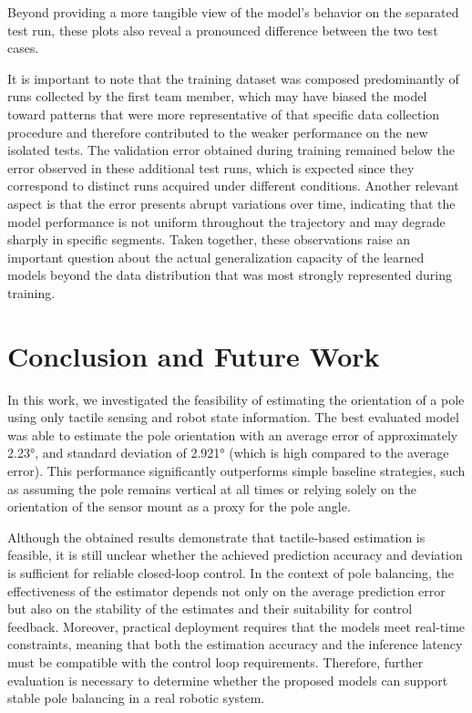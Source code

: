 \documentclass{article}
\begin{document}
Beyond providing a more tangible view of the model's behavior on the separated test run, these plots also reveal a pronounced difference between the two test cases.

It is important to note that the training dataset was composed
predominantly of runs collected by the first team member,
which may have biased the model toward patterns that were more
representative of that specific data collection procedure and
therefore contributed to the weaker performance on the new
isolated tests. The validation error obtained during training
remained below the error observed in these additional test
runs, which is expected since they correspond to distinct runs
acquired under different conditions. Another relevant aspect
is that the error presents abrupt variations over time,
indicating that the model performance is not uniform throughout
the trajectory and may degrade sharply in specific segments.
Taken together, these observations raise an important
question about the actual generalization capacity of the
learned models beyond the data distribution that was most
strongly represented during training.

\section{Conclusion and Future Work}

In this work, we investigated the feasibility of estimating the
orientation of a pole using only tactile sensing and robot state
information. The best evaluated model was able to estimate the pole
orientation with an average error of approximately 2.23°, and standard deviation of 2.921° (which is high compared to the average error).
This performance significantly outperforms simple baseline
strategies, such as assuming the pole remains vertical at all
times or relying solely on the orientation of the sensor mount
as a proxy for the pole angle.

Although the obtained results demonstrate that tactile-based
estimation is feasible, it is still unclear whether the achieved
prediction accuracy and deviation is sufficient for reliable closed-loop
control. In the context of pole balancing, the effectiveness
of the estimator depends not only on the average prediction
error but also on the stability of the estimates and their
suitability for control feedback. Moreover, practical deployment
requires that the models meet real-time constraints, meaning
that both the estimation accuracy and the inference latency
must be compatible with the control loop requirements. Therefore,
further evaluation is necessary to determine whether the
proposed models can support stable pole balancing in a real
robotic system.
\end{document}
